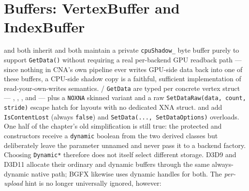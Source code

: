 \section{Buffers: VertexBuffer and IndexBuffer}

 and  both inherit 
and both maintain a private \texttt{cpuShadow\_} byte buffer purely to support
\texttt{GetData()} without requiring a real per-backend GPU readback path --- since nothing
in CNA's own pipeline ever writes GPU-side data back into one of these buffers, a CPU-side
shadow copy is a faithful, sufficient implementation of read-your-own-writes semantics.
 / \texttt{GetData} are typed per concrete vertex struct ---
,
,
, and
 --- plus a
\texttt{NOXNA} skinned variant and a raw \texttt{SetDataRaw(data, count, stride)} escape hatch
for layouts with no dedicated XNA struct.  and
 add \texttt{IsContentLost} (always \texttt{false}) and
\texttt{SetData(..., SetDataOptions)} overloads. One half of the chapter's old simplification
is still true: the protected  and  constructors
receive a \texttt{dynamic} boolean from the two derived classes but deliberately leave the
parameter unnamed and never pass it to a backend factory. Choosing \texttt{Dynamic*} therefore
does not itself select different storage. D3D9 and D3D11 allocate their ordinary and dynamic
buffers through the same always-dynamic native path; BGFX likewise uses dynamic handles for
both. The \emph{per-upload} hint is no longer universally ignored, however:

